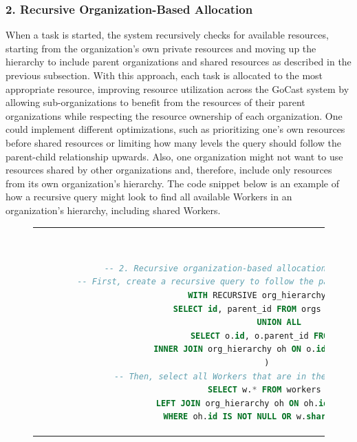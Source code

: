 \subsubsection{2. Recursive Organization-Based Allocation}
    When a task is started, the system recursively checks for available resources, starting from the organization's own private resources and moving up the hierarchy to include parent organizations and shared resources as described in the previous subsection. With this approach, each task is allocated to the most appropriate resource, improving resource utilization across the GoCast system by allowing sub-organizations to benefit from the resources of their parent organizations while respecting the resource ownership of each organization. One could implement different optimizations, such as prioritizing one's own resources before shared resources or limiting how many levels the query should follow the parent-child relationship upwards. Also, one organization might not want to use resources shared by other organizations and, therefore, include only resources from its own organization's hierarchy. The code snippet below is an example of how a recursive query might look to find all available Workers in an organization's hierarchy, including shared Workers.   

    \begin{figure}[htpb]
      \begin{tabular}{c}
      \ \small \begin{lstlisting}[language=SQL]
        -- 2. Recursive organization-based allocation example query
        -- First, create a recursive query to follow the parent-child hierarchy upward
        WITH RECURSIVE org_hierarchy AS (
            SELECT id, parent_id FROM orgs WHERE id = ?
            UNION ALL
            SELECT o.id, o.parent_id FROM orgs o
            INNER JOIN org_hierarchy oh ON o.id = oh.parent_id 
        ) 
        -- Then, select all Workers that are in the hierarchy or shared
        SELECT w.* FROM workers w
        LEFT JOIN org_hierarchy oh ON oh.id = w.org_id
        WHERE oh.id IS NOT NULL OR w.shared = true;
        \end{lstlisting}
      \end{tabular}
      \label{fig:recursive-allocation}
    \end{figure}

